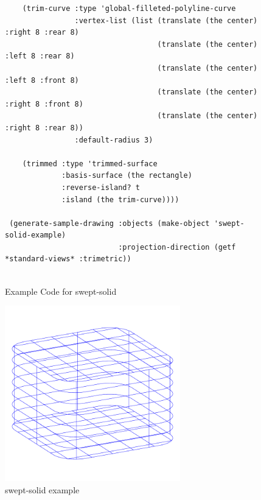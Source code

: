 \documentclass [11pt]{book}
\begin{document}
\begin{itemize}
\begin{figure}
\begin{lrbox}{\boxedverb}
\begin{minipage}{\linewidth}
{\begin{verbatim}
    (trim-curve :type 'global-filleted-polyline-curve
                :vertex-list (list (translate (the center) :right 8 :rear 8)
                                   (translate (the center) :left 8 :rear 8)
                                   (translate (the center) :left 8 :front 8)
                                   (translate (the center) :right 8 :front 8)
                                   (translate (the center) :right 8 :rear 8))
                :default-radius 3)

    (trimmed :type 'trimmed-surface
             :basis-surface (the rectangle)
             :reverse-island? t
             :island (the trim-curve))))

 (generate-sample-drawing :objects (make-object 'swept-solid-example)
                          :projection-direction (getf *standard-views* :trimetric))


\end{verbatim}}
\end{minipage}
\end{lrbox}
\fbox{\usebox{\boxedverb}}

\caption{Example Code for swept-solid}

\label{fig:example-code-swept-solid}

\end{figure}

\begin{figure}
\begin{center}
\includegraphics[width=3in,height=3in]{../images/example-swept-solid.pdf}
\end{center}

\caption{swept-solid example}

\label{fig:swept-solid}

\end{figure}






\end{itemize}
\end{document}
